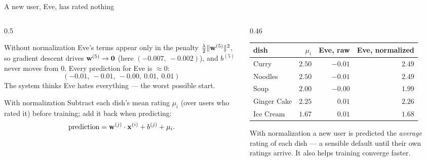 \documentclass[aspectratio=169,10pt]{beamer}
\begin{document}
\begin{frame}{A new user, Eve, has rated nothing}
  \begin{columns}[T,onlytextwidth]
    \begin{column}{0.5\textwidth}
      \footnotesize
      \begin{block}{Without normalization}
        Eve's terms appear only in the penalty $\frac{\lambda}{2}\|\mathbf{w}^{(5)}\|^2$, so
        gradient descent drives $\mathbf{w}^{(5)} \to \mathbf{0}$ (here $(-0.007,\ -0.002)$), and
        $b^{(5)}$ never moves from $0$. Every prediction for Eve is $\approx 0$:
        \[ (-0.01,\ -0.01,\ -0.00,\ 0.01,\ 0.01) \]
        The system thinks Eve hates everything --- the worst possible start.
      \end{block}
      \begin{block}{With normalization}
        Subtract each dish's mean rating $\mu_i$ (over users who rated it) before
        training; add it back when predicting:
        \[ \text{prediction} = \mathbf{w}^{(j)}\cdot\mathbf{x}^{(i)} + b^{(j)} + \mu_i . \]
      \end{block}
    \end{column}
    \begin{column}{0.46\textwidth}
      \footnotesize
      \renewcommand{\arraystretch}{1.18}
      \begin{tabular}{@{}lrrr@{}}
        \toprule
        dish & $\mu_i$ & Eve, raw & Eve, normalized\\
        \midrule
        Curry & $2.50$ & $-0.01$ & $2.49$\\
        Noodles & $2.50$ & $-0.01$ & $2.49$\\
        Soup & $2.00$ & $-0.00$ & $1.99$\\
        Ginger Cake & $2.25$ & $0.01$ & $2.26$\\
        Ice Cream & $1.67$ & $0.01$ & $1.68$\\
        \bottomrule
      \end{tabular}
      \vspace{2mm}
      \begin{keyidea}
        With normalization a new user is predicted the \emph{average} rating of each
        dish --- a sensible default until their own ratings arrive. It also helps
        training converge faster.
      \end{keyidea}
    \end{column}
  \end{columns}
\end{frame}
\end{document}
